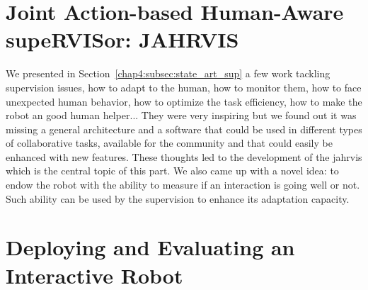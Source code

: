 \documentclass[english,a4paper,11pt,twoside]{StyleThese}
\begin{document}
\part{Joint Action-based Human-Aware supeRVISor: JAHRVIS}\label{part:part3}
\begin{partintro}
	We presented in Section~\ref{chap4:subsec:state_art_sup} a few work tackling supervision issues, \ie how to adapt to the human, how to monitor them, how to face unexpected human behavior, how to optimize the task efficiency, how to make the robot an good human helper... They were very inspiring but we found out it was missing a general architecture and a software that could be used in different types of collaborative tasks, available for the community and that could easily be enhanced with new features. These thoughts led to the development of the \acrfull{jahrvis} which is the central topic of this part. We also came up with a novel idea: to endow the robot with the ability to measure if an interaction is going well or not. Such ability can be used by the supervision to enhance its adaptation capacity.
\end{partintro}





\part{Deploying and Evaluating an Interactive Robot}\label{part:part4}




\newpage
\listoftodos[Notes]


\appendix







%


\cleardoublepage
\end{document}
